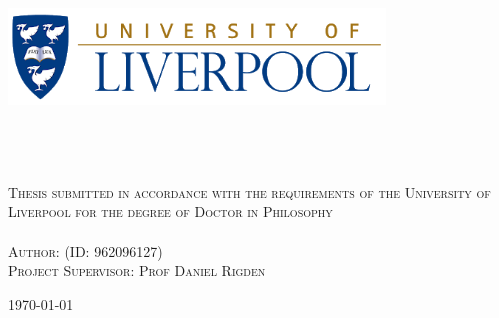 \begin{titlepage}
\center
\begin{center}
\includegraphics[width=100mm]{title/unnamed.png}\\[0cm] 
\end{center}
\ifdefined\school
\large \textsc{\school}\\[1.5cm] %
\ifdefined\department
\large \department\\[1.5cm] %
\fi
\makeatletter
\textsc{{ \huge \bfseries \thesistitle}}\\[1.5cm] %
\textsc{Thesis submitted in accordance with the requirements of the University of Liverpool for the degree of Doctor in Philosophy}\\
\textsc{}\\
\textsc{Author: \authorname \hspace{0.25cm} (ID: 962096127)}\\[0cm] %
\textsc{Project Supervisor: Prof Daniel Rigden}\\[0cm] %


\vspace{1.9cm}


\vspace{1cm}
\textsc{{\large \today}}\\[2cm] %
\vspace{1cm}
\vfill 
\end{titlepage}